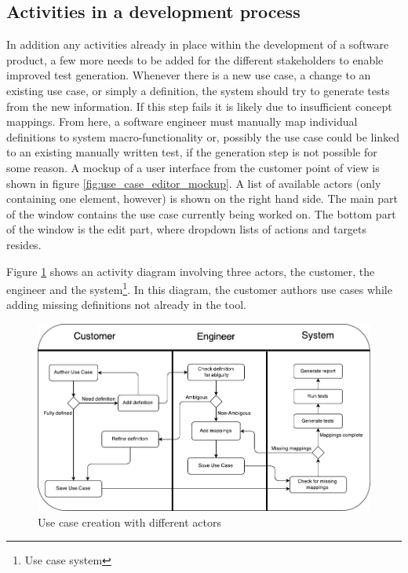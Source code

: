 \subsection{Activities in a development process}
In addition any activities already in place within the development of a software product, a few more needs to be added for the different stakeholders to enable improved test generation.
Whenever there is a new use case, a change to an existing use case, or simply a definition, the system should try to generate tests from the new information. If this step fails it is likely due to insufficient concept mappings. From here, a software engineer must manually map individual definitions to system macro-functionality or, possibly the use case could be linked to an existing manually written test, if the generation step is not possible for some reason. A mockup of a user interface from the customer point of view is shown in figure \ref{fig:use_case_editor_mockup}. A list of available actors (only containing one element, however) is shown on the right hand side. The main part of the window contains the use case currently being worked on. The bottom part of the window is the edit part, where dropdown lists of actions and targets resides.

Figure \ref{fig:use_case_creation_activity_diagram} shows an activity diagram involving three actors, the customer, the engineer and the system\footnote{Use case system}. In this diagram, the customer authors use cases while adding missing definitions not already in the tool. 
\begin{figure}[!htbp]
\includegraphics[scale=0.75]{img/use_case_creation_activity_diagram}
\centering
\caption{Use case creation with different actors}
\label{fig:use_case_creation_activity_diagram}
\end{figure}

